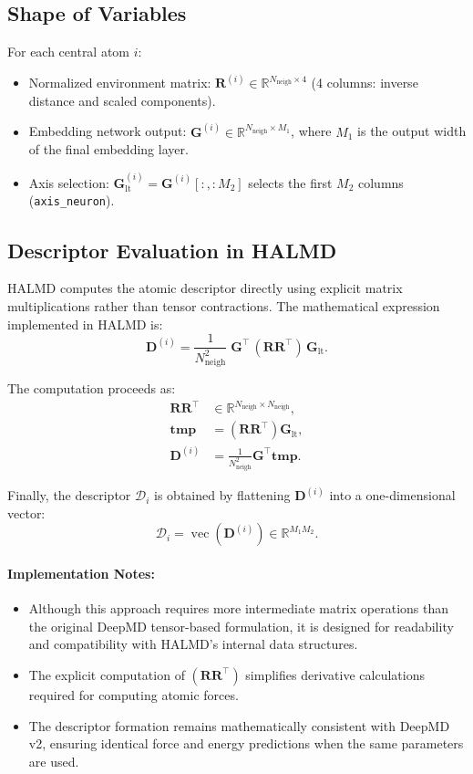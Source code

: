 \documentclass[12pt,a4paper]{article}
\begin{document}
\subsection*{Shape of Variables}

For each central atom $i$:
\begin{itemize}
  \item Normalized environment matrix: $\mathbf{R}^{(i)} \in \mathbb{R}^{N_{\mathrm{neigh}} \times 4}$ (4 columns: inverse distance and scaled components).
  \item Embedding network output: $\mathbf{G}^{(i)} \in \mathbb{R}^{N_{\mathrm{neigh}} \times M_1}$, where $M_1$ is the output width of the final embedding layer.
  \item Axis selection: $\mathbf{G}^{(i)}_{\text{lt}} = \mathbf{G}^{(i)}[:, :M_2]$ selects the first $M_2$ columns (\texttt{axis\_neuron}).
\end{itemize}

\subsection*{Descriptor Evaluation in HALMD}

HALMD computes the atomic descriptor directly using explicit matrix multiplications rather than tensor contractions.  
The mathematical expression implemented in HALMD is:
\[
\mathbf{D}^{(i)} = 
\frac{1}{N_{\mathrm{neigh}}^2}\;
\mathbf{G}^{\top}\,
(\mathbf{R}\mathbf{R}^{\top})\,
\mathbf{G}_{\text{lt}}.
\]

The computation proceeds as:
\[
\begin{aligned}
\mathbf{R}\mathbf{R}^{\top} &\in \mathbb{R}^{N_{\mathrm{neigh}} \times N_{\mathrm{neigh}}},\\
\mathbf{tmp} &= (\mathbf{R}\mathbf{R}^{\top}) \mathbf{G}_{\text{lt}},\\
\mathbf{D}^{(i)} &= \frac{1}{N_{\mathrm{neigh}}^2} \mathbf{G}^{\top} \mathbf{tmp}.
\end{aligned}
\]

Finally, the descriptor $\mathcal{D}_i$ is obtained by flattening $\mathbf{D}^{(i)}$ into a one-dimensional vector:
\[
\mathcal{D}_i = \operatorname{vec}(\mathbf{D}^{(i)}) \in \mathbb{R}^{M_1 M_2}.
\]

\paragraph{Implementation Notes:}
\begin{itemize}
    \item Although this approach requires more intermediate matrix operations than the original DeepMD tensor-based formulation, it is designed for readability and compatibility with HALMD’s internal data structures.
    \item The explicit computation of $(\mathbf{R}\mathbf{R}^{\top})$ simplifies derivative calculations required for computing atomic forces.
    \item The descriptor formation remains mathematically consistent with DeepMD v2, ensuring identical force and energy predictions when the same parameters are used.
\end{itemize}
\end{document}
